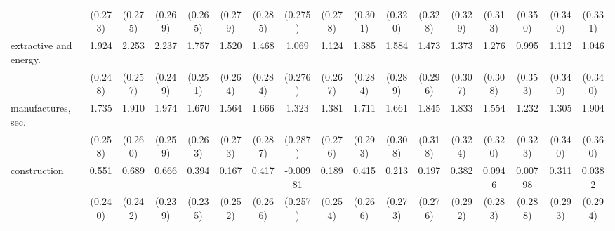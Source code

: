 {\begin{tabular}{l*{16}{c}}
                    &     (0.273)         &     (0.275)         &     (0.269)         &     (0.265)         &     (0.279)         &     (0.285)         &     (0.275)         &     (0.278)         &     (0.301)         &     (0.320)         &     (0.328)         &     (0.329)         &     (0.313)         &     (0.350)         &     (0.340)         &     (0.331)         \\
[1em]
extractive and energy.&       1.924\sym{***}&       2.253\sym{***}&       2.237\sym{***}&       1.757\sym{***}&       1.520\sym{***}&       1.468\sym{***}&       1.069\sym{***}&       1.124\sym{***}&       1.385\sym{***}&       1.584\sym{***}&       1.473\sym{***}&       1.373\sym{***}&       1.276\sym{***}&       0.995\sym{**} &       1.112\sym{**} &       1.046\sym{**} \\
                    &     (0.248)         &     (0.257)         &     (0.249)         &     (0.251)         &     (0.264)         &     (0.284)         &     (0.276)         &     (0.267)         &     (0.284)         &     (0.289)         &     (0.296)         &     (0.307)         &     (0.308)         &     (0.353)         &     (0.340)         &     (0.340)         \\
[1em]
manufactures, sec.  &       1.735\sym{***}&       1.910\sym{***}&       1.974\sym{***}&       1.670\sym{***}&       1.564\sym{***}&       1.666\sym{***}&       1.323\sym{***}&       1.381\sym{***}&       1.711\sym{***}&       1.661\sym{***}&       1.845\sym{***}&       1.833\sym{***}&       1.554\sym{***}&       1.232\sym{***}&       1.305\sym{***}&       1.904\sym{***}\\
                    &     (0.258)         &     (0.260)         &     (0.259)         &     (0.263)         &     (0.273)         &     (0.287)         &     (0.287)         &     (0.276)         &     (0.293)         &     (0.308)         &     (0.318)         &     (0.324)         &     (0.320)         &     (0.323)         &     (0.340)         &     (0.360)         \\
[1em]
construction        &       0.551\sym{*}  &       0.689\sym{**} &       0.666\sym{**} &       0.394         &       0.167         &       0.417         &    -0.00981         &       0.189         &       0.415         &       0.213         &       0.197         &       0.382         &      0.0946         &     0.00798         &       0.311         &      0.0382         \\
                    &     (0.240)         &     (0.242)         &     (0.239)         &     (0.235)         &     (0.252)         &     (0.266)         &     (0.257)         &     (0.254)         &     (0.266)         &     (0.273)         &     (0.276)         &     (0.292)         &     (0.283)         &     (0.288)         &     (0.293)         &     (0.294)         \\

\end{tabular}}
